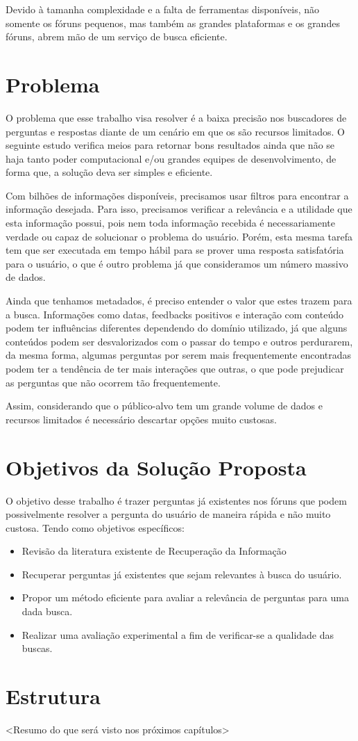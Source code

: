 Devido à tamanha complexidade e a falta de ferramentas disponíveis, não somente os fóruns pequenos, mas também as grandes plataformas e os grandes fóruns, abrem mão de um serviço de busca eficiente. 
\section{Problema}
O problema que esse trabalho visa resolver é a baixa precisão nos buscadores de perguntas e respostas diante de um cenário em que os são recursos limitados. O seguinte estudo verifica meios para retornar bons resultados ainda que não se haja tanto poder computacional e/ou grandes equipes de desenvolvimento, de forma que, a solução deva ser simples e eficiente.

Com bilhões de informações disponíveis, precisamos usar filtros para encontrar a informação desejada. Para isso, precisamos verificar a relevância e a utilidade que esta informação possui, pois nem toda informação recebida é necessariamente verdade ou capaz de solucionar o problema do usuário. Porém, esta mesma tarefa tem que ser executada em tempo hábil para se prover uma resposta satisfatória para o usuário, o que é outro problema já que consideramos um número massivo de dados. 

Ainda que tenhamos metadados, é preciso entender o valor que estes trazem para a busca. Informações como datas, feedbacks positivos e interação com conteúdo podem ter influências diferentes dependendo do domínio utilizado, já que alguns conteúdos podem ser desvalorizados com o passar do tempo e outros perdurarem, da mesma forma, algumas perguntas por serem mais frequentemente encontradas podem ter a tendência de ter mais interações que outras, o que pode prejudicar as perguntas que não ocorrem tão frequentemente.

Assim, considerando que o público-alvo tem um grande volume de dados e recursos limitados é necessário descartar opções muito custosas.

\section{Objetivos da Solução Proposta}
O objetivo desse trabalho é trazer perguntas já existentes nos fóruns que podem possivelmente resolver a pergunta do usuário de maneira rápida e não muito custosa. Tendo como objetivos específicos:

\begin{itemize}
    \item Revisão da literatura existente de Recuperação da Informação
    \item Recuperar perguntas já existentes que sejam relevantes à busca do usuário.
    \item Propor um método eficiente para avaliar a relevância de perguntas para uma dada busca.
    \item Realizar uma avaliação experimental a fim de verificar-se a qualidade das buscas.
\end{itemize}

\section{Estrutura}

<Resumo do que será visto nos próximos capítulos>